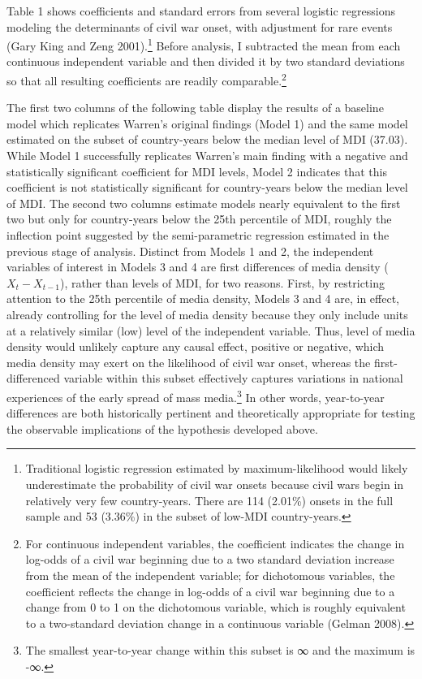 \documentclass[11pt,article,oneside]{memoir}
\begin{document}
Table 1 shows coefficients and standard errors from several logistic
regressions modeling the determinants of civil war onset, with
adjustment for rare events (Gary King and Zeng 2001).\footnote{Traditional
  logistic regression estimated by maximum-likelihood would likely
  underestimate the probability of civil war onsets because civil wars
  begin in relatively very few country-years. There are 114 (2.01\%)
  onsets in the full sample and 53 (3.36\%) in the subset of low-MDI
  country-years.} Before analysis, I subtracted the mean from each
continuous independent variable and then divided it by two standard
deviations so that all resulting coefficients are readily
comparable.\footnote{For continuous independent variables, the
  coefficient indicates the change in log-odds of a civil war beginning
  due to a two standard deviation increase from the mean of the
  independent variable; for dichotomous variables, the coefficient
  reflects the change in log-odds of a civil war beginning due to a
  change from 0 to 1 on the dichotomous variable, which is roughly
  equivalent to a two-standard deviation change in a continuous variable
  (Gelman 2008).}

The first two columns of the following table display the results of a
baseline model which replicates Warren's original findings (Model 1) and
the same model estimated on the subset of country-years below the median
level of MDI (37.03). While Model 1 successfully replicates Warren's
main finding with a negative and statistically significant coefficient
for MDI levels, Model 2 indicates that this coefficient is not
statistically significant for country-years below the median level of
MDI. The second two columns estimate models nearly equivalent to the
first two but only for country-years below the 25th percentile of MDI,
roughly the inflection point suggested by the semi-parametric regression
estimated in the previous stage of analysis. Distinct from Models 1 and
2, the independent variables of interest in Models 3 and 4 are first
differences of media density ($X_{t} - X_{t-1}$), rather than levels of
MDI, for two reasons. First, by restricting attention to the 25th
percentile of media density, Models 3 and 4 are, in effect, already
controlling for the level of media density because they only include
units at a relatively similar (low) level of the independent variable.
Thus, level of media density would unlikely capture any causal effect,
positive or negative, which media density may exert on the likelihood of
civil war onset, whereas the first-differenced variable within this
subset effectively captures variations in national experiences of the
early spread of mass media.\footnote{The smallest year-to-year change
  within this subset is ∞ and the maximum is -∞.} In other words,
year-to-year differences are both historically pertinent and
theoretically appropriate for testing the observable implications of the
hypothesis developed above.
\end{document}
